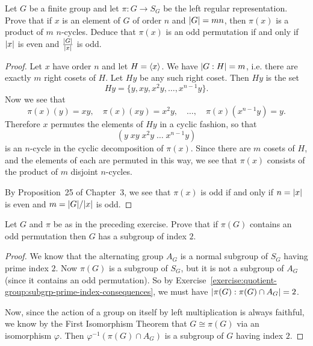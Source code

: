  Let $G$ be a finite group and let $\pi\colon G\to S_G$
be the left regular representation. Prove that if $x$ is an element of
$G$ of order $n$ and $\lvert{G}\rvert = mn$, then $\pi(x)$ is a product of $m$
$n$-cycles. Deduce that $\pi(x)$ is an odd permutation if and only if
$\lvert{x}\rvert$ is even and $\frac{\lvert{G}\rvert}{\lvert{x}\rvert}$ is odd.
\begin{proof}
  Let $x$ have order $n$ and let $H = \langle{x}\rangle$. We have
  $\lvert{G : H}\rvert = m$, i.e. there are exactly $m$ right cosets of
  $H$. Let $Hy$ be any such right coset. Then $Hy$ is the set
  \begin{equation*}
    Hy = \{ y, xy, x^2y, \dots, x^{n-1}y \}.
  \end{equation*}
  Now we see that
  \begin{equation*}
    \pi(x)(y) = xy, \quad \pi(x)(xy) = x^2y, \quad \dots, \quad
    \pi(x)(x^{n-1}y) = y.
  \end{equation*}
  Therefore $x$ permutes the elements of $Hy$ in a cyclic fashion, so
  that
  \begin{equation*}
    (y\;xy\;x^2y\;\dots\;x^{n-1}y)
  \end{equation*}
  is an $n$-cycle in the cyclic decomposition of $\pi(x)$. Since there
  are $m$ cosets of $H$, and the elements of each are permuted in this
  way, we see that $\pi(x)$ consists of the product of $m$ disjoint
  $n$-cycles.

  By Proposition~25 of Chapter~3, we see that $\pi(x)$ is odd if and
  only if $n = \lvert{x}\rvert$ is even and $m = \lvert{G}\rvert/\lvert{x}\rvert$ is odd.
\end{proof}

 Let $G$ and $\pi$ be as in the preceding exercise. Prove
that if $\pi(G)$ contains an odd permutation then $G$ has a subgroup
of index $2$.
\begin{proof}
  We know that the alternating group $A_G$ is a normal subgroup of
  $S_G$ having prime index $2$. Now $\pi(G)$ is a subgroup of $S_G$,
  but it is not a subgroup of $A_G$ (since it contains an odd
  permutation). So by
  Exercise~\ref{exercise:quotient-group:subgrp-prime-index-consequences},
  we must have $\lvert{\pi(G) : \pi(G)\cap A_G}\rvert = 2$.

  Now, since the action of a group on itself by left multiplication is
  always faithful, we know by the First Isomorphism Theorem that
  $G\cong\pi(G)$ via an isomorphism $\varphi$. Then
  $\varphi^{-1}(\pi(G)\cap A_G)$ is a subgroup of $G$ having index
  $2$.
\end{proof}
